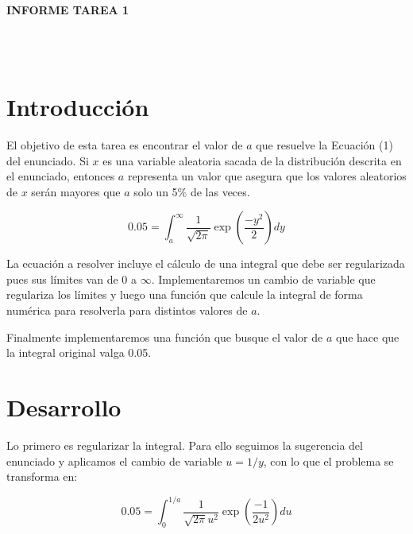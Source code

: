 \documentclass[letter, 11pt]{article}
\begin{document}
\thispagestyle{firstpage}

\begin{center}
  {\uppercase{\LARGE \bf Informe Tarea 1}}
\end{center}

\\
\\


\section{Introducción}

El objetivo de esta tarea es encontrar el valor de $a$ que resuelve la Ecuación
(1) del enunciado. Si $x$ es una variable aleatoria sacada de la distribución
descrita en el enunciado, entonces $a$ representa un valor que asegura que los
valores aleatorios de $x$ serán mayores que $a$ solo un 5\% de las veces.

\begin{equation}
0.05 = \int_{a}^{\infty} \frac{1}{\sqrt{2\pi}} \exp\left({\frac{-y^2}{2}}\right) dy
\end{equation}

La ecuación a resolver incluye el cálculo de una integral que debe ser
regularizada pues sus límites van de $0$ a $\infty$. Implementaremos un cambio
de variable que regulariza los límites y luego una función que calcule la
integral de forma numérica para resolverla para distintos valores de $a$.

Finalmente implementaremos una función que busque el valor de $a$ que hace que la
integral original valga 0.05.

\section{Desarrollo}

Lo primero es regularizar la integral. Para ello seguimos la sugerencia del
enunciado y aplicamos el cambio de variable $u=1/y$, con lo que el problema se
transforma en:

\begin{equation}
0.05 = \int_0^{1/a} \frac{1}{\sqrt{2\pi}u^2} \exp\left({\frac{-1}{2u^2}}\right) du
\end{equation}
\end{document}
